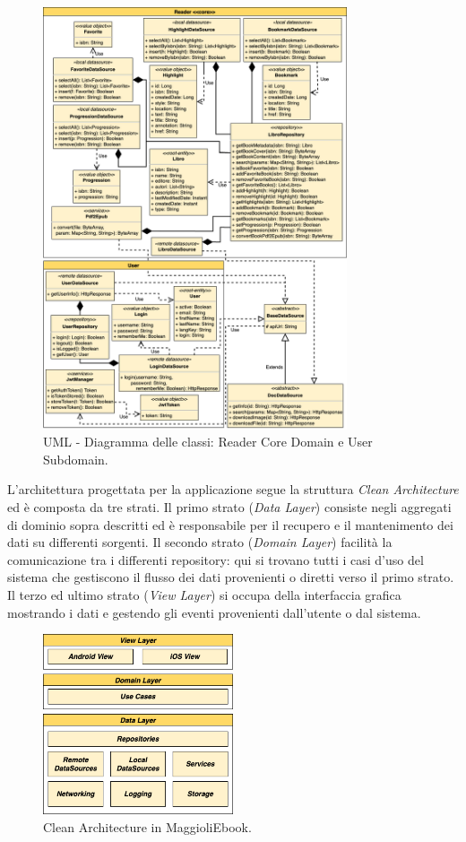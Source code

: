 \begin{figure}[H]
\centering
\includegraphics[width=0.8\textwidth]{img/tesi-25-ddd.drawio.png}
\caption{UML - Diagramma delle classi: Reader Core Domain e User Subdomain.}
\label{fig:5.4}
\end{figure}

L'architettura progettata per la applicazione segue la struttura \textit{Clean Architecture}\cite{Martin17} ed è composta da tre strati. Il primo strato (\textit{Data Layer}) consiste negli aggregati di dominio sopra descritti ed è responsabile per il recupero e il mantenimento dei dati su differenti sorgenti. Il secondo strato (\textit{Domain Layer}) facilità la comunicazione tra i differenti repository: qui si trovano tutti i casi d'uso del sistema che gestiscono il flusso dei dati provenienti o diretti verso il primo strato. Il terzo ed ultimo strato (\textit{View Layer}) si occupa della interfaccia grafica mostrando i dati e gestendo gli eventi provenienti dall'utente o dal sistema.

\begin{figure}[H]
\centering
\includegraphics[width=0.5\textwidth]{img/tesi-2-Page-18.drawio.png}
\caption{Clean Architecture in MaggioliEbook.}
\end{figure}

